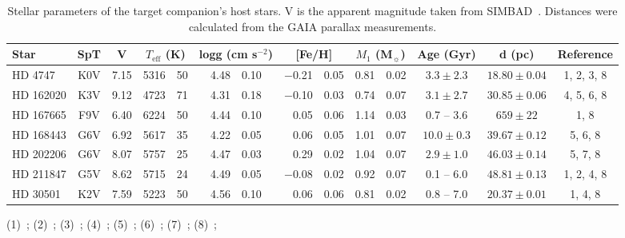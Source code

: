 
\begin{table*}
        \centering{}
        \small{}
        \caption{Stellar parameters of the target companion's host stars. V is the apparent magnitude taken from {SIMBAD}~\citep{wenger_simbad_2000}. {\rd Distances were calculated from the GAIA parallax measurements.}}
        \begin{tabular}{l c c r@{$~\pm~$}l r@{$~\pm~$}l r@{$~\pm~$}l r@{$~\pm~$}l c c c}
            \toprule
            Star & SpT & V &  \multicolumn{2}{c}{\(T_{\textrm{eff}}\) (K)} &  \multicolumn{2}{c}{logg (cm s\(^{-2} \))}  & \multicolumn{2}{c}{[Fe/H]} &  \multicolumn{2}{c}{\(M_1\) (M\(_{\sun} \))} & Age (Gyr) & d (pc) & Reference\\
            \midrule
            {HD 4747}     & K0V & 7.15 & 5316 & 50 & 4.48 & 0.10  & $-$0.21 & 0.05 & 0.81 & 0.02  & $3.3 \pm 2.3$   & $18.80 \pm 0.04$ & 1, 2, 3, 8 \\ 
            {HD 162020} & K3V & 9.12 & 4723 & 71 & 4.31 & 0.18  & $-$0.10 & 0.03 & 0.74 & 0.07  & $3.1 \pm 2.7$   & $30.85 \pm 0.06$ & 4, 5, 6, 8 \\  
            {HD 167665} & F9V & 6.40 & 6224 & 50 & 4.44 & 0.10  & 0.05       & 0.06 & 1.14 & 0.03  & 0.7 -- 3.6           & $659 \pm 22$ & 1, 8 \\
            {HD 168443} & G6V & 6.92 & 5617 & 35 & 4.22 & 0.05 & 0.06       & 0.05 & 1.01 & 0.07  & $10.0 \pm 0.3$  & $39.67 \pm 0.12$ & 5, 6, 8 \\ 
            {HD 202206} & G6V & 8.07 & 5757 & 25 & 4.47 & 0.03 & 0.29       & 0.02 & 1.04 & 0.07  & $2.9 \pm 1.0$    & $46.03 \pm 0.14$ & 5, 7, 8 \\ 
            {HD 211847} & G5V & 8.62 & 5715 & 24 & 4.49 & 0.05 & $-$0.08 & 0.02 & 0.92 & 0.07   & 0.1 -- 6.0            & $48.81 \pm 0.13 $ & 1, 2, 4, 8 \\ 
            {HD 30501}   & K2V & 7.59  & 5223 & 50 & 4.56 & 0.10 & 0.06       & 0.06 & 0.81 & 0.02  & 0.8 -- 7.0           & $20.37 \pm 0.01$ & 1, 4, 8     \\
            \bottomrule
        \end{tabular}
        \begin{tablenotes}
           \item[] (1)~\citet{sahlmann_search_2011}; (2)~\citet{santos_spectroscopic_2005}; (3)~\citet{crepp_trends_2016}; (4)~\citet{tsantaki_deriving_2013}; (5)~\cite{bonfanti_age_2016}; (6)~\citet{santos_spectroscopic_2004}; (7)~\citet{sousa_spectroscopic_2008}; {\rd(8)~\citet{collaboration_gaia_2018}};
         \end{tablenotes}
        \label{tab:starparams}
\end{table*}